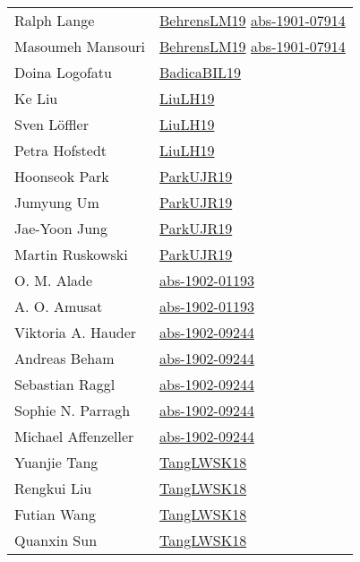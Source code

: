 {\begin{longtable}{p{4cm}p{15cm}}
Ralph Lange & \href{papers/BehrensLM19.pdf}{BehrensLM19}\cite{BehrensLM19} \href{articles/abs-1901-07914.pdf}{abs-1901-07914}\cite{abs-1901-07914} \\
Masoumeh Mansouri & \href{papers/BehrensLM19.pdf}{BehrensLM19}\cite{BehrensLM19} \href{articles/abs-1901-07914.pdf}{abs-1901-07914}\cite{abs-1901-07914} \\
Doina Logofatu & \href{papers/BadicaBIL19.pdf}{BadicaBIL19}\cite{BadicaBIL19} \\
Ke Liu & \href{papers/LiuLH19.pdf}{LiuLH19}\cite{LiuLH19} \\
Sven L{\"{o}}ffler & \href{papers/LiuLH19.pdf}{LiuLH19}\cite{LiuLH19} \\
Petra Hofstedt & \href{papers/LiuLH19.pdf}{LiuLH19}\cite{LiuLH19} \\
Hoonseok Park & \href{papers/ParkUJR19.pdf}{ParkUJR19}\cite{ParkUJR19} \\
Jumyung Um & \href{papers/ParkUJR19.pdf}{ParkUJR19}\cite{ParkUJR19} \\
Jae{-}Yoon Jung & \href{papers/ParkUJR19.pdf}{ParkUJR19}\cite{ParkUJR19} \\
Martin Ruskowski & \href{papers/ParkUJR19.pdf}{ParkUJR19}\cite{ParkUJR19} \\
O. M. Alade & \href{articles/abs-1902-01193.pdf}{abs-1902-01193}\cite{abs-1902-01193} \\
A. O. Amusat & \href{articles/abs-1902-01193.pdf}{abs-1902-01193}\cite{abs-1902-01193} \\
Viktoria A. Hauder & \href{articles/abs-1902-09244.pdf}{abs-1902-09244}\cite{abs-1902-09244} \\
Andreas Beham & \href{articles/abs-1902-09244.pdf}{abs-1902-09244}\cite{abs-1902-09244} \\
Sebastian Raggl & \href{articles/abs-1902-09244.pdf}{abs-1902-09244}\cite{abs-1902-09244} \\
Sophie N. Parragh & \href{articles/abs-1902-09244.pdf}{abs-1902-09244}\cite{abs-1902-09244} \\
Michael Affenzeller & \href{articles/abs-1902-09244.pdf}{abs-1902-09244}\cite{abs-1902-09244} \\
Yuanjie Tang & \href{articles/TangLWSK18.pdf}{TangLWSK18}\cite{TangLWSK18} \\
Rengkui Liu & \href{articles/TangLWSK18.pdf}{TangLWSK18}\cite{TangLWSK18} \\
Futian Wang & \href{articles/TangLWSK18.pdf}{TangLWSK18}\cite{TangLWSK18} \\
Quanxin Sun & \href{articles/TangLWSK18.pdf}{TangLWSK18}\cite{TangLWSK18} \\

\end{longtable}}
